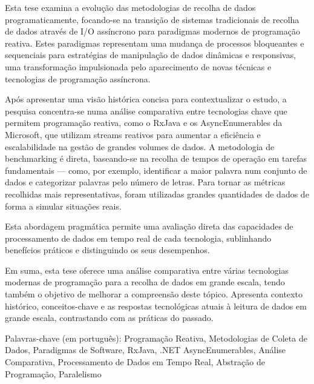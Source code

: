 \abstractPT  %

Esta tese examina a evolução das metodologias de recolha de dados programaticamente, focando-se na transição de sistemas tradicionais de recolha de dados através de I/O assíncrono para paradigmas modernos de programação reativa. Estes paradigmas representam uma mudança de processos bloqueantes e sequenciais para estratégias de manipulação de dados dinâmicas e responsivas, uma transformação impulsionada pelo aparecimento de novas técnicas e tecnologias de programação assíncrona.

Após apresentar uma visão histórica concisa para contextualizar o estudo, a pesquisa concentra-se numa análise comparativa entre tecnologias chave que permitem programação reativa, como o RxJava e os AsyncEnumerables da Microsoft, que utilizam streams reativos para aumentar a eficiência e escalabilidade na gestão de grandes volumes de dados. A metodologia de benchmarking é direta, baseando-se na recolha de tempos de operação em tarefas fundamentais — como, por exemplo, identificar a maior palavra num conjunto de dados e categorizar palavras pelo número de letras. Para tornar as métricas recolhidas mais representativas, foram utilizadas grandes quantidades de dados de forma a simular situações reais.

Esta abordagem pragmática permite uma avaliação direta das capacidades de processamento de dados em tempo real de cada tecnologia, sublinhando benefícios práticos e distinguindo os seus desempenhos.

Em suma, esta tese oferece uma análise comparativa entre várias tecnologias modernas de programação para a recolha de dados em grande escala, tendo também o objetivo de melhorar a compreensão deste tópico. Apresenta contexto histórico, conceitos-chave e as respostas tecnológicas atuais à leitura de dados em grande escala, contrastando com as práticas do passado.

\begin{keywords}
Palavras-chave (em português): Programação Reativa, Metodologias de Coleta de Dados, Paradigmas de Software, RxJava, .NET AsyncEnumerables, Análise Comparativa, Processamento de Dados em Tempo Real, Abstração de Programação, Paralelismo
\end{keywords}

\vspace{1em} %
